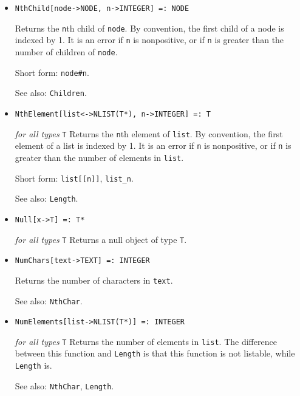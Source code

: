 \begin{itemize}
\item{}
\protect \large \begin{verbatim} 
NthChild[node->NODE, n->INTEGER] =: NODE 
\end{verbatim}\normalsize

\bd
Returns the \verb+n+th child of \verb+node+.
By convention, the first child of a node is indexed by 1.
It is an error if \verb+n+ is nonpositive, or if \verb+n+ is greater
than the number of children of \verb+node+.
\item [Short form:] \verb+node#n+.
\item [See also:] \verb+Children+.
\ed

\item{}
\protect \large \begin{verbatim}
NthElement[list<->NLIST(T*), n->INTEGER] =: T 
\end{verbatim}\normalsize

{\it for all types} {\tt T}
\bd
Returns the \verb+n+th element of \verb+list+.
By convention, the first element of a list is indexed by 1.
It is an error if \verb+n+ is nonpositive, or if \verb+n+ is greater
than the number of elements in \verb+list+.
\item [Short form:] \verb+list[[n]]+, \verb+list_n+.
\item [See also:] \verb+Length+.
\ed

\item{}
\protect \large \begin{verbatim}
Null[x->T] =: T*
\end{verbatim}\normalsize

{\it for all types} {\tt T}
\bd
Returns a null object of type \verb+T+.  
\ed

\item{}
\protect \large \begin{verbatim}
NumChars[text->TEXT] =: INTEGER 
\end{verbatim}\normalsize

\bd
Returns the number of characters in \verb+text+.
\item [See also:] \verb+NthChar+.
\ed

\item{}
\protect \large \begin{verbatim}
NumElements[list->NLIST(T*)] =: INTEGER 
\end{verbatim}\normalsize

{\it for all types} {\tt T}
\bd
Returns the number of elements in \verb+list+.  The difference between
this function and \verb+Length+ is that this function is not listable,
while \verb+Length+ is.  
\item
[See also:] \verb+NthChar+, \verb+Length+.
\ed





\end{itemize}
